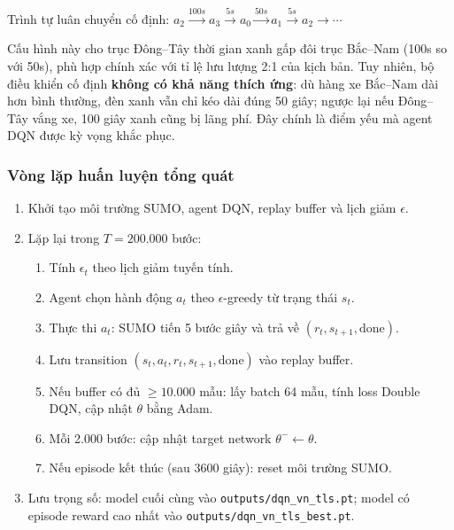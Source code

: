\vspace{6pt}
Trình tự luân chuyển cố định: $a_2 \xrightarrow{100s} a_3 \xrightarrow{5s} a_0 \xrightarrow{50s} a_1 \xrightarrow{5s} a_2 \to \cdots$

\vspace{6pt}
Cấu hình này cho trục Đông--Tây thời gian xanh gấp đôi trục Bắc--Nam (100s so với 50s), phù hợp chính xác với tỉ lệ lưu lượng 2:1 của kịch bản. Tuy nhiên, bộ điều khiển cố định \textbf{không có khả năng thích ứng}: dù hàng xe Bắc--Nam dài hơn bình thường, đèn xanh vẫn chỉ kéo dài đúng 50 giây; ngược lại nếu Đông--Tây vắng xe, 100 giây xanh cũng bị lãng phí. Đây chính là điểm yếu mà agent DQN được kỳ vọng khắc phục.

\subsubsection{Vòng lặp huấn luyện tổng quát}

\begin{enumerate}
    \item Khởi tạo môi trường SUMO, agent DQN, replay buffer và lịch giảm $\epsilon$.
    \item Lặp lại trong $T = 200.000$ bước:
    \begin{enumerate}
        \item Tính $\epsilon_t$ theo lịch giảm tuyến tính.
        \item Agent chọn hành động $a_t$ theo $\epsilon$-greedy từ trạng thái $s_t$.
        \item Thực thi $a_t$: SUMO tiến 5 bước giây và trả về $(r_t, s_{t+1}, \text{done})$.
        \item Lưu transition $(s_t, a_t, r_t, s_{t+1}, \text{done})$ vào replay buffer.
        \item Nếu buffer có đủ $\geq 10.000$ mẫu: lấy batch 64 mẫu, tính loss Double DQN, cập nhật $\theta$ bằng Adam.
        \item Mỗi 2.000 bước: cập nhật target network $\theta^- \leftarrow \theta$.
        \item Nếu episode kết thúc (sau 3600 giây): reset môi trường SUMO.
    \end{enumerate}
    \item Lưu trọng số: model cuối cùng vào \texttt{outputs/dqn\_vn\_tls.pt}; model có episode reward cao nhất vào \texttt{outputs/dqn\_vn\_tls\_best.pt}.
\end{enumerate}
